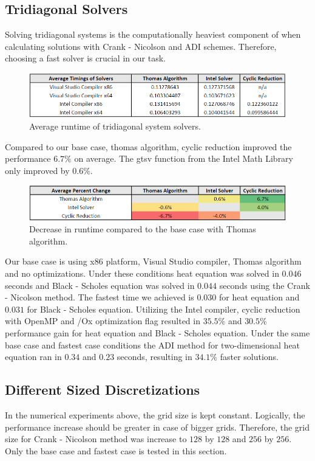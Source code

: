\documentclass[12pt, oneside]{book}
\theoremstyle{plain}
\theoremstyle{definition}
\begin{document}
\subsection{Tridiagonal Solvers}
Solving tridiagonal systems is the computationally heaviest component of when calculating solutions with Crank - Nicolson and ADI schemes. Therefore, choosing a fast solver is crucial in our task.

\begin{figure}[!htb]
    \centering
        \includegraphics[scale=0.65]{solverAverage.png}
    \caption{Average runtime of tridiagonal system solvers.}
\end{figure}

 Compared to our base case, thomas algorithm, cyclic reduction improved the performance $6.7 \%$ on average. The gtsv function from the Intel Math Library only improved by $0.6 \%$. 

 \begin{figure}[!htb]
    \centering
        \includegraphics[scale=0.65]{solverAveragePercentage.png}
    \caption{Decrease in runtime compared to the base case with Thomas algorithm.}
\end{figure}

Our base case is using x86 platform, Visual Studio compiler, Thomas algorithm and no optimizations. Under these conditions heat equation was solved in $0.046$ seconds and Black - Scholes equation was solved in $0.044$ seconds using the Crank - Nicolson method. The fastest time we achieved is $0.030$ for heat equation and $0.031$ for Black - Scholes equation. Utilizing the Intel compiler, cyclic reduction with OpenMP and /Ox optimization flag resulted in $35.5 \%$ and $30.5 \%$ performance gain for heat equation and Black - Scholes equation. Under the same base case and fastest case conditions the ADI method for two-dimensional heat equation ran in $0.34$ and $0.23$ seconds, resulting in $34.1 \%$ faster solutions.

\subsection{Different Sized Discretizations} 
In the numerical experiments above, the grid size is kept constant. Logically, the performance increase should be greater in case of bigger grids. Therefore, the grid size for Crank - Nicolson method was increase to $128$ by $128$ and $256$ by $256$. Only the base case and fastest case is tested in this section.
\end{document}
